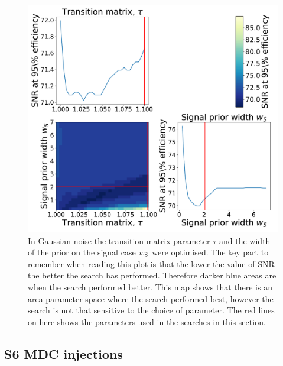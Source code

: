 \begin{figure}[h]
    \centering
    \includegraphics[width=0.9\linewidth]{C3_soap/gauss_optimised.pdf}
    \caption[Optimisation of line aware statistic in Gaussian noise.]{In Gaussian noise the transition matrix parameter $\tau$ and the width of the prior on the signal case $w_{\rm{S}}$ were optimised. The key part to remember when reading this plot is that the lower the value of \gls{SNR} the better the search has performed. Therefore darker blue areas are when the search performed better. This map shows that there is an area parameter space where the search performed best, however the search is not that sensitive to the choice of parameter. The red lines on here shows the parameters used in the searches in this section.}
    \label{soap:las:optimisation:gaussplot}
\end{figure}

\clearpage

\subsection{\label{soap:las:optimisation:s6mdc}S6 \gls{MDC} injections}

